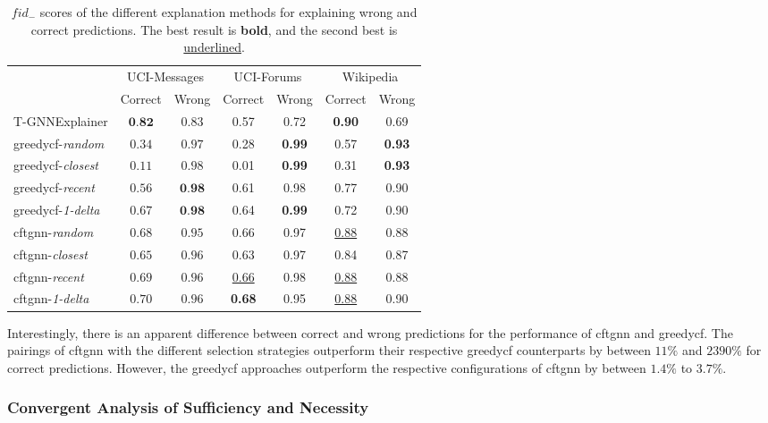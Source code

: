 \begin{table}[ht]
    \centering
    \small
    \begin{tabular}{lcccccc}
    \hline
         &  \multicolumn{2}{c}{UCI-Messages}&  \multicolumn{2}{c}{UCI-Forums}&  \multicolumn{2}{c}{Wikipedia}\\
         &  Correct&  Wrong&  Correct&  Wrong&  Correct& Wrong\\
         \hline
         T-GNNExplainer&  $\textbf{0.82}$&  $0.83$&  0.57&  0.72&  \textbf{0.90}& 0.69\\
         \gls{greedycf}-\textit{random}&  $0.34$&  $0.97$&  0.28&  \textbf{0.99}&  0.57& \textbf{0.93}\\
         \gls{greedycf}-\textit{closest}&  $0.11$&  $0.98$&  0.01&  \textbf{0.99}&  0.31& \textbf{0.93}\\
         \gls{greedycf}-\textit{recent}&  $0.56$&  $\textbf{0.98}$&  0.61&  0.98&  0.77& 0.90\\
         \gls{greedycf}-\textit{1-delta}&  $0.67$&  $\textbf{0.98}$&  0.64&  \textbf{0.99}&  0.72& 0.90\\
         \gls{cftgnn}-\textit{random}&  $0.68$&  $0.95$&  0.66&  0.97&  \underline{0.88}& 0.88\\
         \gls{cftgnn}-\textit{closest}&  $0.65$&  $0.96$&  0.63&  0.97&  0.84& 0.87\\
         \gls{cftgnn}-\textit{recent}&  $0.69$&  $0.96$&  \underline{0.66}&  0.98&  \underline{0.88}& 0.88\\
 \gls{cftgnn}-\textit{1-delta}& \underline{$0.70$}& $0.96$& \textbf{0.68}& 0.95& \underline{0.88}&0.90\\
 \hline
    \end{tabular}
    \caption{$fid_-$ scores of the different explanation methods for explaining wrong and correct predictions. The best result is \textbf{bold}, and the second best is \underline{underlined}.}
    \label{t_fid_minus}
\end{table}

Interestingly, there is an apparent difference between correct and wrong predictions for the performance of \gls{cftgnn} and \gls{greedycf}. The pairings of \gls{cftgnn} with the different selection strategies outperform their respective \gls{greedycf} counterparts by between $11\%$ and $2390\%$ for correct predictions. However, the \gls{greedycf} approaches outperform the respective configurations of \gls{cftgnn} by between $1.4\%$ to $3.7\%$.

\FloatBarrier
\subsubsection{Convergent Analysis of Sufficiency and Necessity}
\label{s_Evaluation_Results_ConvergentAnalysis}

